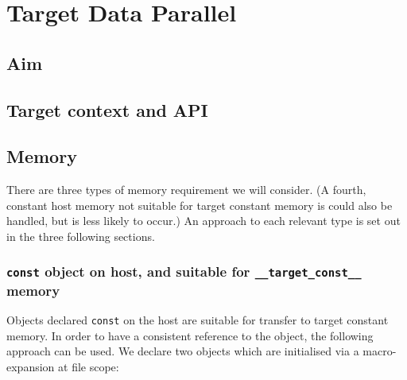 %
%
%
%
%

\section{Target Data Parallel}

\subsection{Aim}

\subsection{Target context and API}

\subsection{Memory}

There are three types of memory requirement we will consider.
(A fourth, constant host memory not suitable for target constant
memory is could also be handled, but is less likely to occur.)
An approach to each relevant type is set out in the three following
sections.

\subsubsection{\texttt{const} object on host, and suitable for
\texttt{\_\_target\_const\_\_} memory}

Objects declared \texttt{const} on the host are suitable for transfer
to target constant memory. In order to have a consistent reference
to the object, the following approach can be used. We declare two
objects which are initialised via a macro-expansion at file scope:

